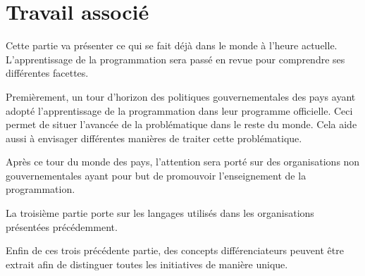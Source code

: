 \chapter{Travail associé}
Cette partie va présenter ce qui se fait déjà dans le monde à l'heure actuelle. L'apprentissage de la programmation sera passé en revue pour comprendre ses différentes facettes.

Premièrement, un tour d'horizon des politiques gouvernementales des pays ayant adopté l'apprentissage de la programmation dans leur programme officielle. Ceci permet de situer l'avancée de la problématique dans le reste du monde. Cela aide aussi à envisager différentes manières de traiter cette problématique. 

Après ce tour du monde des pays, l'attention sera porté sur des organisations non gouvernementales ayant pour but de promouvoir l'enseignement de la programmation. 

La troisième partie porte sur les langages utilisés dans les organisations présentées précédemment. 

Enfin de ces trois précédente partie, des concepts différenciateurs peuvent être extrait afin de distinguer toutes les initiatives de manière unique.






